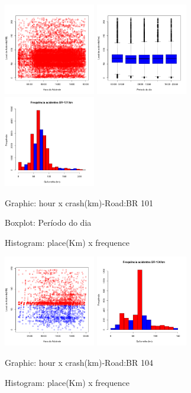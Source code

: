 \documentclass[conference,compsoc]{IEEEtran}
\begin{document}
\begin{figure}[ht]
\begin{center}
     \includegraphics[height=4.0cm]{graficos/br101_1.png}
     \includegraphics[height=4.0cm]{graficos/br101_2.png}
     \includegraphics[height=4.0cm]{graficos/br101_3.png}
     \small{\caption{Graphic: hour x crash(km)-Road:BR 101}}
     \small{\caption{Boxplot: Período do dia}}
     \small{\caption{Histogram: place(Km) x frequence}}
\end{center}
\end{figure}

\begin{figure}[ht]
\begin{center}
     \includegraphics[height=4.0cm]{graficos/br104_1.png}
     \includegraphics[height=4.0cm]{graficos/br104_3.png}
	\caption{Graphic: hour x crash(km)-Road:BR 104}
	\caption{Histogram: place(Km) x frequence}
\end{center}
\end{figure}
\end{document}
